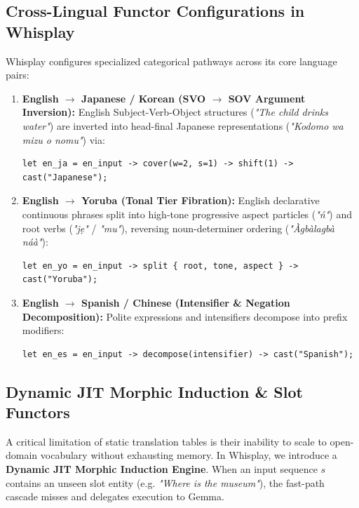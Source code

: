 \documentclass[11pt]{article}
\begin{document}
\subsection{Cross-Lingual Functor Configurations in Whisplay}
Whisplay configures specialized categorical pathways across its core language pairs:
\begin{enumerate}
    \item \textbf{English $\to$ Japanese / Korean (SVO $\to$ SOV Argument Inversion):}
    English Subject-Verb-Object structures (\emph{"The child drinks water"}) are inverted into head-final Japanese representations (\emph{"Kodomo wa mizu o nomu"}) via:
    \begin{lstlisting}[language=neu]
let en_ja = en_input -> cover(w=2, s=1) -> shift(1) -> cast("Japanese");
    \end{lstlisting}
    \item \textbf{English $\to$ Yoruba (Tonal Tier Fibration):}
    English declarative continuous phrases split into high-tone progressive aspect particles (\emph{"\'n"}) and root verbs (\emph{"j\d{e}"} / \emph{"mu"}), reversing noun-determiner ordering (\emph{"\`Agb\`alagb\`a n\'a\`a"}):
    \begin{lstlisting}[language=neu]
let en_yo = en_input -> split { root, tone, aspect } -> cast("Yoruba");
    \end{lstlisting}
    \item \textbf{English $\to$ Spanish / Chinese (Intensifier \& Negation Decomposition):}
    Polite expressions and intensifiers decompose into prefix modifiers:
    \begin{lstlisting}[language=neu]
let en_es = en_input -> decompose(intensifier) -> cast("Spanish");
    \end{lstlisting}
\end{enumerate}

\subsection{Dynamic JIT Morphic Induction \& Slot Functors}
A critical limitation of static translation tables is their inability to scale to open-domain vocabulary without exhausting memory. In Whisplay, we introduce a \textbf{Dynamic JIT Morphic Induction Engine}. When an input sequence $s$ contains an unseen slot entity (e.g. \emph{"Where is the museum"}), the fast-path cascade misses and delegates execution to Gemma.
\end{document}
